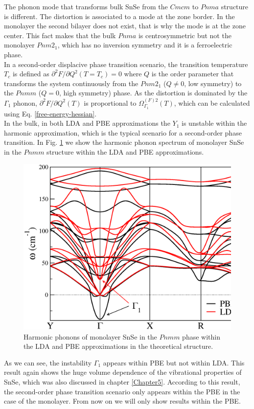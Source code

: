 The phonon mode that transforms bulk SnSe from the $Cmcm$ to $Pnma$ structure is different. The distortion is 
associated to a mode at the zone border. In the monolayer the second bilayer does not exist, that is why the mode is 
at the zone center. This fact makes that the bulk $Pnma$ is centrosymmetric but not the monolayer $Pnm2_{1}$, which 
has no inversion symmetry and it is a ferroelectric phase. \\

In a second-order displacive phase transition scenario, the transition temperature $T_{c}$ is defined as 
$\partial^{2}F/\partial Q^{2}(T=T_{c})=0$ where $Q$ is the order parameter that transforms the system continuously 
from the $Pnm2_{1}$ ($Q\ne0$, low symmetry) to the $Pnmm$ ($Q=0$, high symmetry) phase. As the distortion is 
dominated by the $\Gamma_{1}$ phonon, $\partial^{2}F/\partial Q^{2}(T)$ is proportional to 
$\Omega^{(F)2}_{\Gamma_{1}}(T)$, which can be calculated using Eq. \ref{free-energy-hessian}. \\

In the bulk, in both LDA and PBE approximations the $Y_{1}$ is unstable within the harmonic approximation, 
which is the typical scenario for a second-order phase transition. In Fig. \ref{harmonic-mono} we show the 
harmonic phonon spectrum of monolayer SnSe in the $Pnmm$ structure within the LDA and PBE approximations. 
\begin{figure}[h]
\includegraphics[width=\linewidth]{Figures/harmonic-mono.eps}
\caption[Harmonic phonons of monolayer SnSe.]{Harmonic phonons of monolayer SnSe in the $Pnmm$ phase within the LDA 
and PBE approximations in the theoretical structure.}
\label{harmonic-mono}
\end{figure}
As we can see, the instability $\Gamma_{1}$ appears within PBE but not within LDA. This result again shows the huge 
volume dependence of the vibrational properties of SnSe, which was also discussed in chapter \ref{Chapter5}. 
According to this result, the second-order phase transition scenario only appears within the PBE in the case of the 
monolayer. From now on we will only show results within the PBE. \\

